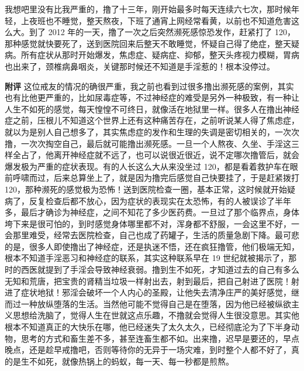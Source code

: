 \begin{case}
    我想吧里没有比我严重的，撸了十三年，刚开始最多时每天连续六七次，那时候年轻，上夜班也不睡觉，整天熬夜，下班了通宵上网经常看黄，以前也不知道危害这么大。到了 2012 年的一天，撸了一次之后突然濒死感惊恐发作，赶紧打了 120，那种感觉就快要死了，送到医院回来后整天不敢睡觉，怀疑自己得了绝症，整天疑病。所有症状从那时开始爆发，焦虑症、疑病症、抑郁，整天头疼视力模糊，胃病也出来了，颈椎病鼻咽炎，关键那时候还不知道是手淫惹的！根本没停过。

    \textbf{附评} 这位戒友的情况的确很严重，我之前也看到过很多撸出濒死感的案例，其实也有比他更严重的，比如尿毒症等，不过神经症的难受是另外一种极致，有一种让人生不如死的感觉，每天惶惶不可终日，就像活在地狱里一样。很多人在撸出神经症之前，压根儿不知道这个世界上还有这种痛苦存在，之前听说某人得了焦虑症，就以为是别人自己想多了，其实焦虑症的发作和生理的失调是密切相关的，一次次撸，一次次掏空自己，最后就可能撸出濒死感。一旦一个人熬夜、久坐、手淫这三样全占了，他离开神经症就不远了，也可以说很近很近，说不定哪次撸管后，就会爆发极为严重的症状表现。有的人长这么大从来没坐过 120，都是看着救护车在眼前呼啸而过，后来总算坐上了，就是因为撸完后感觉自己快要挂了，于是赶紧拨打 120，那种濒死的感觉极为恐怖！送到医院检查一圈，基本正常，这时候就开始疑病了，反复检查后都不放心，因为症状的表现实在太恐怖，有的人被误诊了半年多，最后才确诊为神经症，之间不知花了多少医药费。一旦过了那个临界点，身体垮下来是很可怕的，到时感觉身体哪里都不对，浑身都不舒服，一会这里不好，一会那里难受，经常去医院检查，自己也成了药罐子，生活的质量急剧下降。最可悲的是，很多人即使撸出了神经症，还是执迷不悟，还在疯狂撸管，他们极端无知，根本不知道手淫恶习和神经症的联系，其实这种联系早在 19 世纪就被揭示了，那时的西医就提到了手淫会导致神经衰弱。撸到生不如死，才知道过去的自己有多么无知和荒唐，把宝贵的肾精当垃圾一样射出去，射到最后，把自己射进了医院！射进了症状地狱！邪淫会破坏一个人内心的圣殿，让他失去清净庄严的美好感觉，继而过一种放纵堕落的生活。当然他可能不觉得自己是在堕落，因为他已经被纵欲主义思想给洗脑了，觉得人生在世就这点乐趣，不撸就会觉得人生很没意思。其实他根本不知道真正的大快乐在哪，他已经迷失了太久太久，已经彻底沦为了下半身动物，思考的方式和畜生差不多，甚至连畜生都不如。出来撸，迟早是要还的，早点晚点，还是趁早戒撸吧，否则等待你的无异于一场灾难，到时整个人都不好了，真的是生不如死，就像热锅上的蚂蚁，每一天、每一秒都是煎熬。
\end{case}

